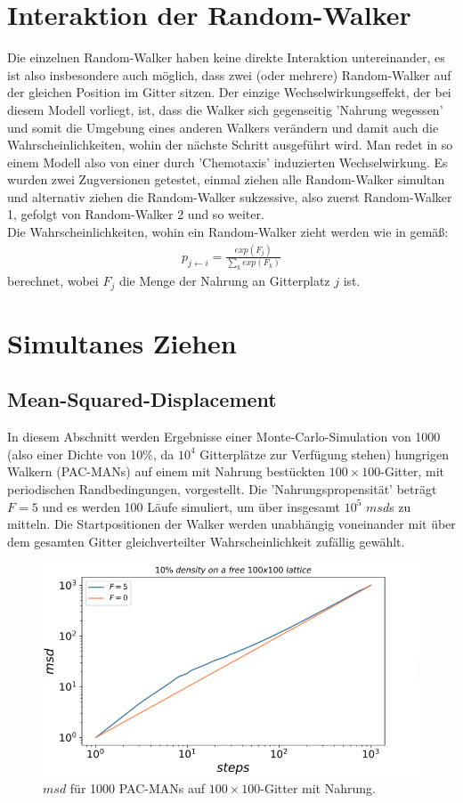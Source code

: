 \documentclass[a4paper, 12pt]{report}
\begin{document}
\section{Interaktion der Random-Walker}
Die einzelnen Random-Walker haben keine direkte Interaktion untereinander, es ist also insbesondere auch möglich, dass zwei (oder mehrere) Random-Walker auf der gleichen Position im Gitter sitzen. Der einzige Wechselwirkungseffekt, der bei diesem Modell vorliegt, ist, dass die Walker sich gegenseitig 'Nahrung wegessen' und somit die Umgebung eines anderen Walkers verändern und damit auch die Wahrscheinlichkeiten, wohin der nächste Schritt ausgeführt wird. Man redet in so einem Modell also von einer durch 'Chemotaxis' induzierten Wechselwirkung. Es wurden zwei Zugversionen getestet, einmal ziehen alle Random-Walker simultan und alternativ ziehen die Random-Walker sukzessive, also zuerst Random-Walker 1, gefolgt von Random-Walker 2 und so weiter. \\
\noindent Die Wahrscheinlichkeiten, wohin ein Random-Walker zieht werden wie in \cite{doi:10.1063/1.4999485} gemäß:
\begin{align}
p_{j \leftarrow i} = \frac{exp({F_j})}{\sum_k exp({F_k})}
\label{Wkeiten}
\end{align}
berechnet, wobei $F_j$ die Menge der Nahrung an Gitterplatz $j$ ist.

\section{Simultanes Ziehen\label{gleichzeitig}}
\subsection{Mean-Squared-Displacement}
In diesem Abschnitt werden Ergebnisse einer Monte-Carlo-Simulation von 1000 (also einer Dichte von 10\%, da $10^4$ Gitterplätze zur Verfügung stehen) hungrigen Walkern (PAC-MANs) auf einem mit Nahrung bestückten $100 \times 100$-Gitter, mit periodischen Randbedingungen, vorgestellt. Die 'Nahrungspropensität' beträgt $F=5$ und es werden 100 Läufe simuliert, um über insgesamt $10^5$ $msd$s zu mitteln. Die Startpositionen der Walker werden unabhängig voneinander mit über dem gesamten Gitter gleichverteilter Wahrscheinlichkeit zufällig gewählt.

\begin{figure}[h!]
	\centering
	\includegraphics[scale=0.8]{msd10_1.png}
	\caption{$msd$ für 1000 PAC-MANs auf $100\times 100$-Gitter mit Nahrung.}
\end{figure}
\end{document}
